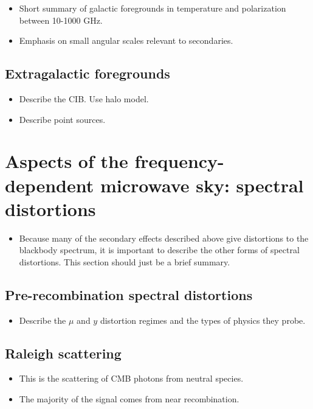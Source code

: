 \documentclass[aps,nofootinbib,groupedaddress]{revtex4}
\begin{document}
\begin{itemize}
\item Short summary of galactic foregrounds in temperature and polarization between 10-1000 GHz.
\item Emphasis on small angular scales relevant to secondaries.
\end{itemize}

\subsection{Extragalactic foregrounds}

\begin{itemize}
\item Describe the CIB. Use halo model.
\item Describe point sources.
\end{itemize}

\section{Aspects of the frequency-dependent microwave sky: spectral distortions}

\begin{itemize}
\item Because many of the secondary effects described above give distortions to the blackbody spectrum, it is important to describe the other forms of spectral distortions. This section should just be a brief summary.
\end{itemize}

\subsection{Pre-recombination spectral distortions}

\begin{itemize}
\item Describe the $\mu$ and $y$ distortion regimes and the types of physics they probe.
\end{itemize}

\subsection{Raleigh scattering}

\begin{itemize}
\item This is the scattering of CMB photons from neutral species.
\item The majority of the signal comes from near recombination.
\end{itemize}
\end{document}
